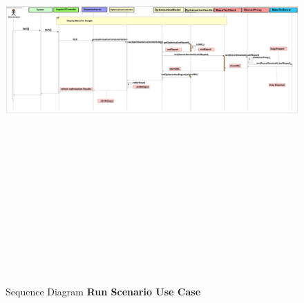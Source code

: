 	\begin{figure}[h]
	\centering
	\includegraphics[width=17.5cm,height=17cm]{SequenceDiagramRunScenario.png}
	\caption{Sequence Diagram \textbf{Run Scenario Use Case}}
    \end{figure}
	
	\pagebreak
	\clearpage
    \newpage 
	
